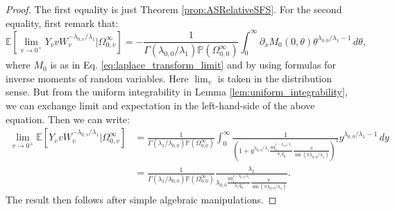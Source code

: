 \documentclass{article}
\numberwithin{equation}{section}
\begin{document}
\SmallMutationRelativeSFS*
\begin{proof}
The first equality is just Theorem \ref{prop:ASRelativeSFS}. For the second equality, first remark that:
\[
\mathbb{E}[\lim_{v\to 0^+}Y_vvW_v^{-\lambda_{0,v}/\lambda_1}|\Omega_{0,v}^\infty]=-\frac{1}{\Gamma(\lambda_{0,0}/\lambda_1)\mathbb{P}(\Omega_{0,0}^\infty)}\int_0^\infty \partial_xM_0(0,\theta)\theta^{\lambda_{0,0}/\lambda_1-1}\,d\theta,
\]
  where $M_0$ is as in Eq. \ref{eq:laplace_transform_limit} and by using formulas for inverse moments of random variables. Here $\lim_v$ is taken in the distribution sense. But from the uniform integrability in Lemma \ref{lem:uniform_integrability}, we can exchange limit and expectation in the left-hand-side of the above equation. Then we can write:
  \begin{align*}
    \lim_{v\to 0^+}\mathbb{E}[Y_vvW_v^{-\lambda_{0,v}/\lambda_1}|\Omega_{0,v}^\infty]&=\frac{1}{\Gamma(\lambda_1/\lambda_{0,0})\mathbb{P}(\Omega_{0,0}^\infty)}\int_0^\infty \frac{1}{\left(1+y^{\lambda_{0,0}/\lambda_1}\frac{ aq_1 ^{1-\lambda_{0,0}/\lambda_1}}{\lambda_1 q_0}\frac{\pi}{\sin(\pi\lambda_{0,0}/\lambda_1)}\right)^2}y^{\lambda_{0,0}/\lambda_1-1}\,dy\\
    &=\frac{1}{\Gamma(\lambda_1/\lambda_{0,0})\mathbb{P}(\Omega_{0,0}^\infty)}\frac{\lambda_1}{\lambda_{0,0}\frac{ aq_1 ^{1-\lambda_{0,0}/\lambda_1}}{\lambda_1 q_0}\frac{\pi}{\sin(\pi\lambda_{0,0}/\lambda_1)}}.
  \end{align*}
The result then follows after simple algebraic manipulations.
\end{proof}
\end{document}
